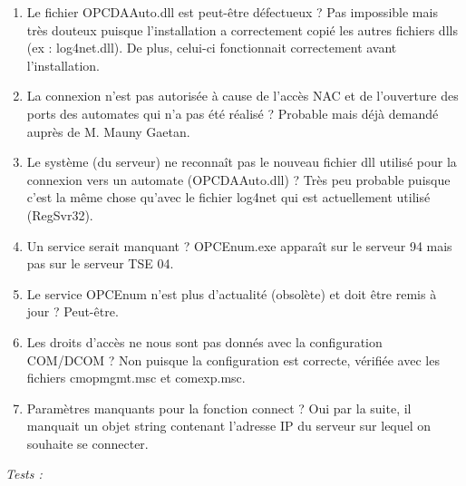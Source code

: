 \documentclass[a4paper,12pt]{extarticle}
\begin{document}
\begin{enumerate}[-]
    \item Le fichier OPCDAAuto.dll est peut-être défectueux ? Pas impossible mais très douteux puisque l'installation a correctement copié les autres fichiers dlls (ex : log4net.dll). De plus, celui-ci fonctionnait correctement avant l'installation.
	\item La connexion n'est pas autorisée à cause de l’accès NAC et de l'ouverture des ports des automates qui n’a pas été réalisé ? Probable mais déjà demandé auprès de M. Mauny Gaetan.
	\item Le système (du serveur) ne reconnaît pas le nouveau fichier dll utilisé pour la connexion vers un automate (OPCDAAuto.dll) ? Très peu probable puisque c'est la même chose qu'avec le fichier log4net qui est actuellement utilisé (RegSvr32).
	\item Un service serait manquant ? OPCEnum.exe apparaît sur le serveur 94 mais pas sur le serveur TSE 04.
	\item Le service OPCEnum n'est plus d'actualité (obsolète) et doit être remis à jour ? Peut-être.
	\item Les droits d'accès ne nous sont pas donnés avec la configuration COM/DCOM ? Non puisque la configuration est correcte, vérifiée avec les fichiers cmopmgmt.msc et comexp.msc.
	\item Paramètres manquants pour la fonction connect ? Oui par la suite, il manquait un objet string contenant l'adresse IP du serveur sur lequel on souhaite se connecter.
\end{enumerate}

\emph{Tests :}
\end{document}

